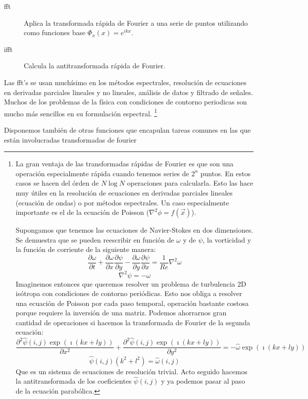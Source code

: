 \begin{description}
\item [fft\texttt{}]Aplica la transformada rápida de
  Fourier a una serie de puntos utilizando como funciones base
  $\Phi_{x}(x)=e^{ikx}$.
\item [ifft]Calcula la antitransformada rápida de Fourier.
\end{description}
Las fft's se usan muchísimo en los métodos espectrales, resolución de
ecuaciones en derivadas parciales lineales y no lineales, análisis de
datos y filtrado de señales. Muchos de los problemas de la física con
condiciones de contorno periodicas son mucho más sencillos en su
formulación espectral.%
\footnote{La gran ventaja de las transformadas rápidas de Fourier es
  que son una operación especialmente rápida cuando tenemos series de
  $2^{n}$ puntos. En estos casos se hacen del órden de $N\log N$
  operaciones para calcularla. Esto las hace muy útiles en la
  resolución de ecuaciones en derivadas parciales lineales (ecuación
  de ondas) o por métodos espectrales. Un caso especialmente
  importante es el de la ecuación de Poisson
  ($\nabla^{2}\phi=f(\vec{x})$).

  Supongamos que tenemos las ecuaciones de Navier-Stokes en dos
  dimensiones.  Se demuestra que se pueden reescribir en función de
  $\omega$ y de $\psi$, la vorticidad y la función de corriente de la
  siguiente manera:
$$ \frac{\partial\omega}{\partial
  t}+\frac{\partial\omega}{\partial x}\frac{\partial\psi}{\partial
  y}-\frac{\partial\omega}{\partial y}\frac{\partial\psi}{\partial
  x}=\frac{1}{Re}\nabla^{2}\omega$$
  $$
  \nabla^{2}\psi=-\omega$$ Imaginemos entonces que queremos resolver
  un problema de turbulencia 2D isótropa con condiciones de contorno
  periódicas. Esto nos obliga a resolver una ecuación de Poisson por
  cada paso temporal, operación bastante costosa porque requiere la
  inversión de una matriz. Podemos ahorrarnos gran cantidad de
  operaciones si hacemos la transformada de Fourier de la segunda
  ecuación:$$
  \frac{\partial^{2}\hat{\psi}(i,j)\exp(\imath(kx+ly))}{\partial
    x^{2}}+\frac{\partial^{2}\hat{\psi}(i,j)\exp(\imath(kx+ly))}{\partial
    y^{2}}=-\hat{\omega}\exp(\imath(kx+ly))$$
  $$
  \hat{\psi}(i,j)(k^{2}+l^{2})=\hat{\omega}(i,j)$$ Que es un sistema
  de ecuaciones de resolución trivial. Acto seguido hacemos la
  antitransformada de los coeficientes $\hat{\psi}(i,j)$ y ya podemos
  pasar al paso de la ecuación parabólica.%
}

Disponemos también de otras funciones que encapulan tareas comunes en
las que están involucradas transformadas de fourier

